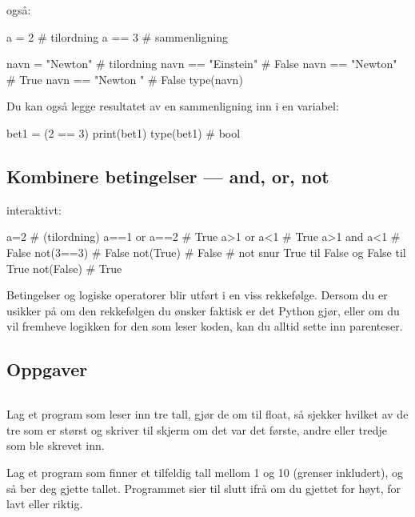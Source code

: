 også:
\begin{usncodebox}
a = 2    # tilordning
a == 3   # sammenligning

navn = "Newton"       # tilordning
navn == "Einstein"    # False 
navn == "Newton"      # True
navn == "Newton "     # False
type(navn)
\end{usncodebox}

Du kan også legge resultatet av en sammenligning inn i en variabel:
\begin{usncodebox}
bet1 = (2 == 3)   
print(bet1)
type(bet1)   # bool
\end{usncodebox}

\subsection{Kombinere betingelser --- and, or, not}

interaktivt:
\begin{usncodebox}
a=2             # (tilordning)
a==1 or a==2    # True 
a>1  or  a<1    # True 
a>1  and a<1    # False
not(3==3)       # False
not(True)       # False  # not snur True til False og False til True
not(False)      # True 
\end{usncodebox}

Betingelser og logiske operatorer blir utført i en viss rekkefølge. Dersom du er usikker på om den rekkefølgen du ønsker faktisk er det Python gjør, eller om du vil fremheve logikken for den som leser koden, kan du alltid sette inn parenteser.

\subsection{Oppgaver}


\begin{solution}
\begin{lstlisting}
\end{lstlisting}
\end{solution}

\begin{exercise}
Lag et program som leser inn tre tall, gjør de om til float, så sjekker hvilket av de tre som er størst og skriver til skjerm om det var det første, andre eller tredje som ble skrevet inn.
\end{exercise}

\begin{exercise}
Lag et program som finner et tilfeldig tall mellom 1 og 10 (grenser inkludert), og så ber deg gjette tallet. Programmet sier til slutt ifrå om du gjettet for høyt, for lavt eller riktig.
\end{exercise}

